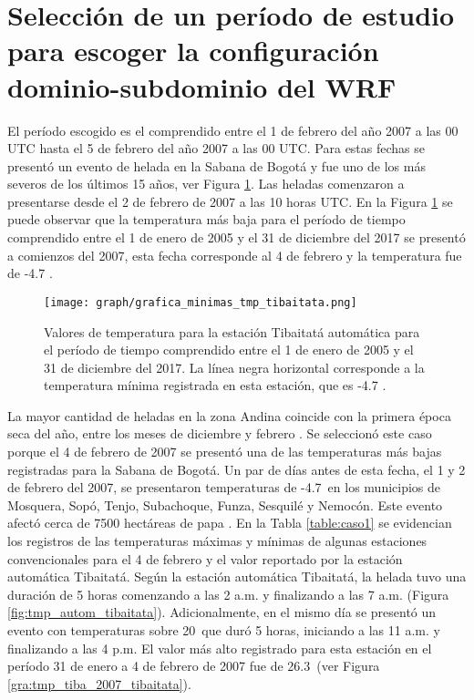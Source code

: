 \section{Selección de un período de estudio para escoger la configuración dominio-subdominio del WRF}

El período escogido es el comprendido entre el 1 de febrero del año 2007 a las 00 UTC hasta el 5 de febrero del año 2007 a las 00 UTC. Para estas fechas se presentó un evento de helada en la Sabana de Bogotá y fue uno de los más severos de los últimos 15 años, ver Figura \ref{fig:tmp_autom_tibaitata_1}. Las heladas comenzaron a presentarse desde el 2 de febrero de 2007 a las 10 horas UTC.
En la Figura \ref{fig:tmp_autom_tibaitata_1} se puede observar que la temperatura más baja para el período de tiempo comprendido entre el 1 de enero de 2005 y el 31 de diciembre del 2017 se presentó a comienzos del 2007, esta fecha corresponde al 4 de febrero y la temperatura fue de -4.7 \celc.
\begin{figure}[H]
    \centering
    \texttt{[image: graph/grafica\_minimas\_tmp\_tibaitata.png]}
    \caption{Valores de temperatura para la estación Tibaitatá automática para el período de tiempo comprendido entre el 1 de enero de 2005 y el 31 de diciembre del 2017. La línea negra horizontal corresponde a la temperatura mínima registrada en esta estación, que es -4.7 \celc.}
    \label{fig:tmp_autom_tibaitata_1}
\end{figure}

La mayor cantidad de heladas en la zona Andina coincide con la primera época seca del año, entre los meses de diciembre y febrero \citep{IDEAM2012a}. Se seleccionó este caso porque el 4 de febrero de 2007 se presentó una de las temperaturas más bajas registradas para la Sabana de Bogotá. Un par de días antes de esta fecha, el 1 y 2 de febrero del 2007, se presentaron temperaturas de -4.7\celc \ en los municipios de Mosquera, Sopó, Tenjo, Subachoque, Funza, Sesquilé y Nemocón. Este evento afectó cerca de 7500 hectáreas de papa \citep{ElTiempo2007}. En la Tabla \ref{table:caso1} se evidencian los registros de las temperaturas máximas y mínimas de algunas estaciones convencionales para el 4 de febrero y el valor reportado por la estación automática Tibaitatá. Según la estación automática Tibaitatá, la helada tuvo una duración de 5 horas comenzando a las 2 a.m. y finalizando a las 7 a.m. (Figura \ref{fig:tmp_autom_tibaitata}). Adicionalmente, en el mismo día se presentó un evento con temperaturas sobre 20\celc\ que duró 5 horas, iniciando a las 11 a.m. y finalizando a las 4 p.m. El valor más alto registrado para esta estación en el período 31 de enero a 4 de febrero de 2007 fue de 26.3\celc\ (ver Figura \ref{gra:tmp_tiba_2007_tibaitata}).

